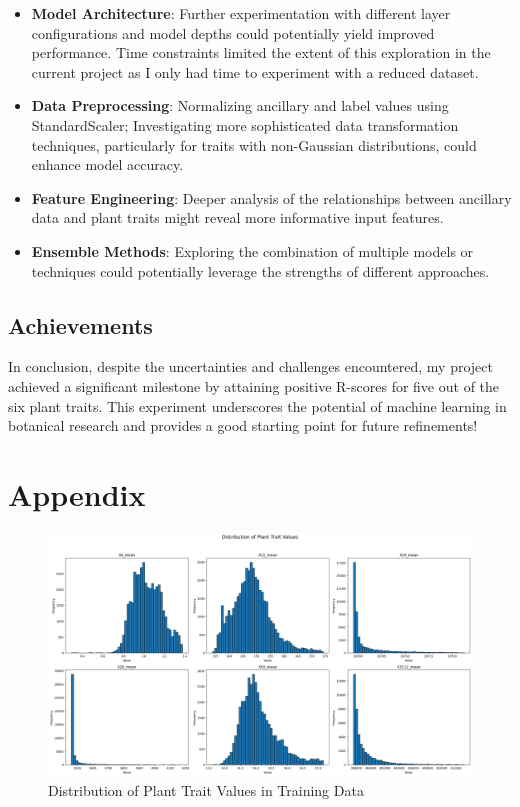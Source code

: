 \documentclass{article}
\begin{document}
\begin{itemize}
    \item \textbf{Model Architecture}: Further experimentation with different layer configurations and model depths could potentially yield improved performance. Time constraints limited the extent of this exploration in the current project as I only had time to experiment with a reduced dataset.
    
    \item \textbf{Data Preprocessing}: Normalizing ancillary and label values using StandardScaler; Investigating more sophisticated data transformation techniques, particularly for traits with non-Gaussian distributions, could enhance model accuracy.
    
    \item \textbf{Feature Engineering}: Deeper analysis of the relationships between ancillary data and plant traits might reveal more informative input features.
    
    \item \textbf{Ensemble Methods}: Exploring the combination of multiple models or techniques could potentially leverage the strengths of different approaches.
\end{itemize}

\subsection{Achievements}

In conclusion, despite the uncertainties and challenges encountered, my project achieved a significant milestone by attaining positive R-scores for five out of the six plant traits. This experiment underscores the potential of machine learning in botanical research and provides a good starting point for future refinements!

\newpage

\section{Appendix}
\begin{figure}[h]
    \centering
    \includegraphics[width=\textwidth]{train_distribution.png}
    \caption{Distribution of Plant Trait Values in Training Data}
    \label{fig:train_dist}
\end{figure}
\end{document}
